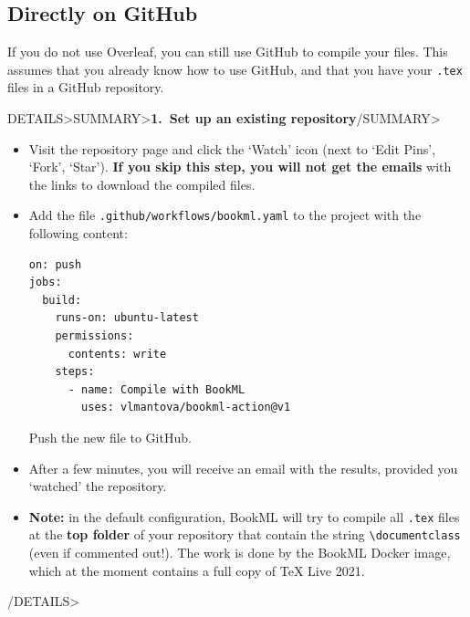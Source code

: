\documentclass[a4paper,british]{article}
\newenvironment{foldedframe}[1][]{%
    \<DETAILS>\<SUMMARY>\textbf{#1}\</SUMMARY>}%
  {\</DETAILS>}
\newenvironment{foldedframe}[1][]{\bgroup\colorlet{TFFrameColor}{SpringGreen}
  \colorlet{TFTitleColor}{black}\begin{titled-frame}{#1}}{\end{titled-frame}\egroup}
\def\ltxinline{\lstinline[style=bookml,frame=none]}
\begin{document}
\subsection{Directly on GitHub}\label{directly-on-github}
If you do not use Overleaf, you can still use GitHub to compile your files. This assumes that you already know how to use GitHub, and that you have your \texttt{.tex} files in a GitHub repository.

\begin{foldedframe}[1.\ Set up an existing repository]
  \begin{itemize}
    \item Visit the repository page and click the `Watch' icon (next to `Edit Pins', `Fork', `Star'). \textbf{If you skip this step, you will not get the emails} with the links to download the compiled files.
    \item Add the file \texttt{.github/workflows/bookml.yaml} to the project with the following content:
      \begin{lstlisting}[style=yaml,name=bookml.yaml]
on: push
jobs:
  build:
    runs-on: ubuntu-latest
    permissions:
      contents: write
    steps:
      - name: Compile with BookML
        uses: vlmantova/bookml-action@v1
      \end{lstlisting}
      Push the new file to GitHub.
    \item After a few minutes, you will receive an email with the results, provided you `watched' the repository.
    \item \textbf{Note:} in the default configuration, BookML will try to compile all \texttt{.tex} files at the \textbf{top folder} of your repository that contain the string \ltxinline|\documentclass| (even if commented out!). The work is done by the BookML Docker image, which at the moment contains a full copy of \TeX{} Live 2021.
  \end{itemize}
\end{foldedframe}
\end{document}

